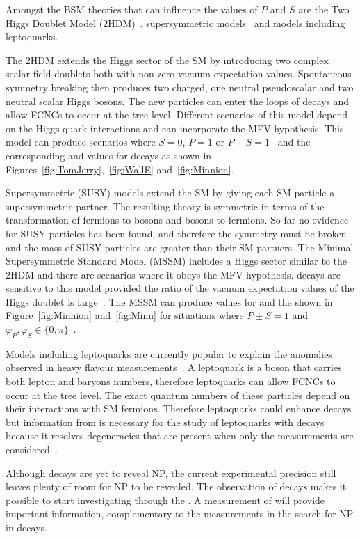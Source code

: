 Amongst the BSM theories that can influence the values of $P$ and $S$ are the Two Higgs Doublet Model (2HDM)~\cite{HALL1981397}, supersymmetric models~\cite{Witten:1981nf} and models including leptoquarks. %

The 2HDM extends the Higgs sector of the SM by introducing two complex scalar field doublets both with non-zero vacuum expectation values. Spontaneous symmetry breaking then produces two charged, one neutral pseudoscalar and two neutral scalar Higgs bosons. The new particles can enter the loops of \bmumu decays and allow FCNCs to occur at the tree level. Different scenarios of this model depend on the Higgs-quark interactions and can incorporate the MFV hypothesis. This model can produce scenarios where $S=0$, $P=1$ or $P\pm S = 1$~\cite{Buras:2013uqa,Knegjens:2014zva} and the corresponding \BF and \ADG values for \bsmumu decays as shown in Figures~\ref{fig:TomJerry},~\ref{fig:WallE} and~\ref{fig:Minnion}.

Supersymmetric (SUSY) models extend the SM by giving each SM particle a supersymmetric partner. The resulting theory is symmetric in terms of the transformation of fermions to bosons and bosons to fermions. So far no evidence for SUSY particles has been found, and therefore the symmetry must be broken and the mass of SUSY particles are greater than their SM partners. The Minimal Supersymmetric Standard Model (MSSM) includes a Higgs sector similar to the 2HDM and there are scenarios where it obeys the MFV hypothesis. \bmumu decays are sensitive to this model provided the ratio of the vacuum expectation values of the Higgs doublet is large~\cite{Buras:2002wq,Babu:1999hn,Isidori:2001fv}. The MSSM can produce values for \ADG and the \bsmumu \BF shown in Figure~\ref{fig:Minnion} and~\ref{fig:Minn} for situations where $P\pm S =1$ and $\varphi_P, \varphi_S \in \{0, \pi\}$~\cite{Buras:2013uqa,Knegjens:2014zva}.

Models including leptoquarks are currently popular to explain the anomalies observed in heavy flavour measurements~\cite{Barbieri:2016las,Becirevic:2016yqi,Hiller:2014yaa,Bauer:2015knc,Fajfer:2015ycq}. A leptoquark is a boson that carries both lepton and baryons numbers, therefore leptoquarks can allow FCNCs to occur at the tree level. The exact quantum numbers of these particles depend on their interactions with SM fermions. Therefore leptoquarks could enhance \bmumu decays but information from \ADG is necessary for the study of leptoquarks with \bmumu decays because it resolves degeneracies that are present when only the \BF measurements are considered~\cite{Altmannshofer:2017wqy}.

Although \bmumu decays are yet to reveal NP, the current experimental precision still leaves plenty of room for NP to be revealed. The observation of \bsmumu decays makes it possible to start investigating \ADG through the \bsmumu \el. A measurement of \ADG will provide important information, complementary to the \bmumu \BF measurements in the search for NP in \bsmumu decays.


